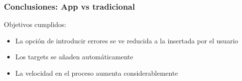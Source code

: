 \begin{frame}[label=conclusiones]
    \frametitle{Conclusiones: App vs tradicional}
    Objetivos cumplidos:
    \begin{itemize}
        \item[\checkmark] La opción de introducir errores se ve reducida a la insertada por el usuario
        \item[\checkmark] Los targets se añaden automáticamente
        \item[\checkmark] La velocidad en el proceso aumenta considerablemente
    \end{itemize}
    
\end{frame}